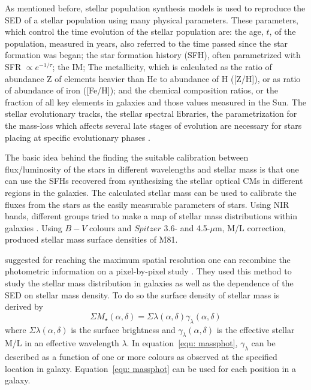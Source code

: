As mentioned before, stellar population synthesis models is used to reproduce the SED of a stellar population using many physical parameters. These parameters, which control the time evolution of the stellar population are:
the age, $t$, of the population, measured in years, also referred to the time passed since the star formation was began;
the star formation history (SFH), often parametrized with SFR $\propto e^{-1/\tau}$; the IM; The metallicity, which is calculated as the ratio of abundance Z of elements heavier than He to abundance of H ([Z/H]), or as ratio of abundance of iron ([Fe/H]); 
and the chemical composition ratios, or the fraction of all key elements in galaxies and those values measured in the Sun. The stellar evolutionary tracks, the stellar spectral libraries, the parametrization for the mass-loss which affects several late stages of evolution are necessary for stars placing at specific evolutionary phases \citep{Courteau13}.


The basic idea behind the finding the suitable calibration between flux/luminosity of the stars in different wavelengths and stellar mass is that one can use the SFHs recovered from synthesizing the stellar optical CMs in different regions in the galaxies. The calculated stellar mass can be used  to calibrate the fluxes from the stars as the easily measurable parameters of stars. Using NIR bands, different groups tried to make a map of stellar mass distributions within galaxies \citep[e.g.,][]{Elmgreen84}.  Using $B-V$ colours \citep{Bell01} and $Spitzer$ 3.6- and 4.5-$\mu$m, M/L correction, \cite{Kendall08} produced stellar mass surface densities of M81. 

\cite{Zibetti08} suggested for reaching the maximum spatial resolution one can recombine the photometric information on a pixel-by-pixel study \citep{Conti03}. They used this method to study the stellar mass distribution in galaxies as well as the dependence of the SED on stellar mass density. To do so the surface density of stellar mass is derived by 
\begin{equation}
\label{equ: massphot}
\Sigma M_\star (\alpha, \delta) = \Sigma \lambda(\alpha, \delta) \gamma_{\lambda}(\alpha, \delta)
\end{equation}
where $\Sigma \lambda(\alpha, \delta)$ is the surface brightness and $\gamma_{\lambda}(\alpha, \delta)$ is the effective stellar M/L in an effective wavelength $\lambda$. In equation~\ref{equ: massphot},  $\gamma_{\lambda}$ can be described as a function of one or more colours as observed at the specified location in galaxy. Equation~\ref{equ: massphot} can be used for each position in a galaxy.


